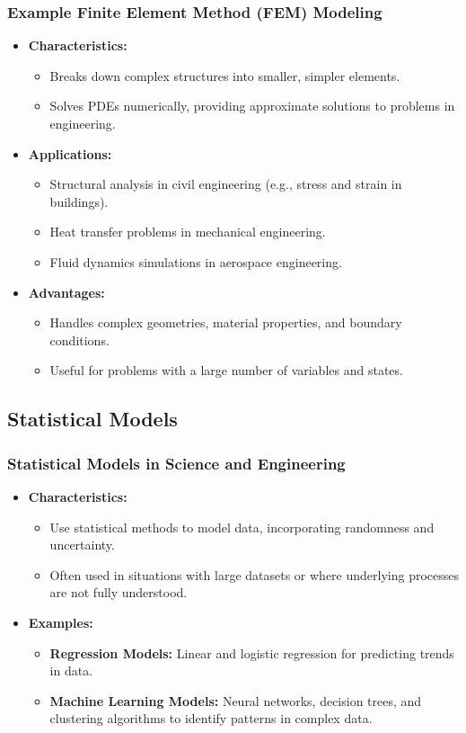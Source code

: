 \documentclass{beamer}
\begin{document}
\begin{frame}
\frametitle{ Example Finite Element Method (FEM) Modeling}
\begin{itemize}
    \item \textbf{Characteristics:} 
    \begin{itemize}
        \item Breaks down complex structures into smaller, simpler elements.
        \item Solves PDEs numerically, providing approximate solutions to problems in engineering.
    \end{itemize}
    \item \textbf{Applications:}
    \begin{itemize}
        \item Structural analysis in civil engineering (e.g., stress and strain in buildings).
        \item Heat transfer problems in mechanical engineering.
        \item Fluid dynamics simulations in aerospace engineering.
    \end{itemize}
    \item \textbf{Advantages:}
    \begin{itemize}
        \item Handles complex geometries, material properties, and boundary conditions.
        \item Useful for problems with a large number of variables and states.
    \end{itemize}
\end{itemize}
\end{frame}

\subsection{Statistical Models}

\begin{frame}
\frametitle{Statistical Models in Science and Engineering}
\begin{itemize}
    \item \textbf{Characteristics:} 
    \begin{itemize}
        \item Use statistical methods to model data, incorporating randomness and uncertainty.
        \item Often used in situations with large datasets or where underlying processes are not fully understood.
    \end{itemize}
    \item \textbf{Examples:}
    \begin{itemize}
        \item \textbf{Regression Models:} Linear and logistic regression for predicting trends in data.
        \item \textbf{Machine Learning Models:} Neural networks, decision trees, and clustering algorithms to identify patterns in complex data.
    \end{itemize}
\end{itemize}
\end{frame}
\end{document}
